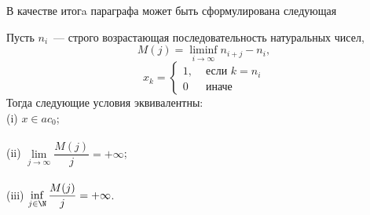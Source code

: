 
В качестве итогa параграфа может быть сформулирована следующая

\begin{theorem}
	\label{thm:M_j_ac0_inf_lim}
	Пусть $n_i$~--- строго возрастающая последовательность натуральных чисел,
	\begin{equation}
		\label{eq:definition_M_j}
		M(j) = \liminf_{i\to\infty} n_{i+j} - n_i,
	\end{equation}
	\begin{equation}
		x_k = \left\{\begin{array}{ll}
			1, & \mbox{~если~} k = n_i
			\\
			0  & \mbox{~иначе~}
		\end{array}\right.
	\end{equation}
	Тогда следующие условия эквивалентны:
	\\
	(i)   $x \in ac_0$;
	\\\\
	(ii)  $\lim\limits_{j \to \infty} \dfrac{M(j)}{j} = +\infty$;
	\\\\
	(iii) $\inf\limits_{j \in \N}     \dfrac{M(j)}{j} = +\infty$.
\end{theorem}
